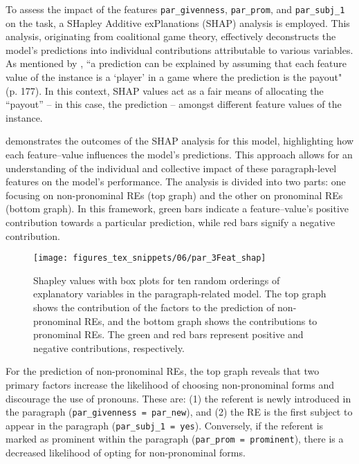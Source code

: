 To assess the impact of the features \texttt{par\_givenness}, \texttt{par\_prom}, and \texttt{par\_subj\_1} on the \context task, a SHapley Additive exPlanations (SHAP) analysis is employed. This analysis, originating from coalitional game theory, effectively deconstructs the model's predictions into individual contributions attributable to various variables. As mentioned by \citet{molnar2019interpretable}, ``a prediction can be explained by assuming that each feature value of the instance is a `player' in a game where the prediction is the payout" (p. 177). In this context, SHAP values act as a fair means of allocating the ``payout'' – in this case, the prediction – amongst different feature values of the instance. 

 demonstrates the outcomes of the SHAP analysis for this model, highlighting how each feature--value influences the model’s predictions. This approach allows for an understanding of the individual and collective impact of these paragraph-level features on the model's performance. The analysis is divided into two parts: one focusing on non-pronominal REs (top graph) and the other on pronominal REs (bottom graph). In this framework, green bars indicate a feature--value's positive contribution towards a particular prediction, while red bars signify a negative contribution.

\begin{figure}
	\centering
	\texttt{[image: figures\_tex\_snippets/06/par\_3Feat\_shap]}
	\caption[Shapley values with box plots for ten random orderings of explanatory variables in the paragraph-related model.]{Shapley values with box plots for ten random orderings of explanatory variables in the paragraph-related model. The top graph shows the contribution of the factors to the prediction of non-pronominal REs, and the bottom graph shows the contributions to pronominal REs. The green and red bars represent positive and negative contributions, respectively.}
	\label{fig:parShapValue}
\end{figure}

For the prediction of non-pronominal REs, the top graph reveals that two primary factors increase the likelihood of choosing non-pronominal forms and discourage the use of pronouns. These are: (1) the referent is newly introduced in the paragraph (\texttt{par\_givenness = par\_new}), and (2) the RE is the first subject to appear in the paragraph (\texttt{par\_subj\_1 = yes}). Conversely, if the referent is marked as prominent within the paragraph (\texttt{par\_prom = prominent}), there is a decreased likelihood of opting for non-pronominal forms. 

